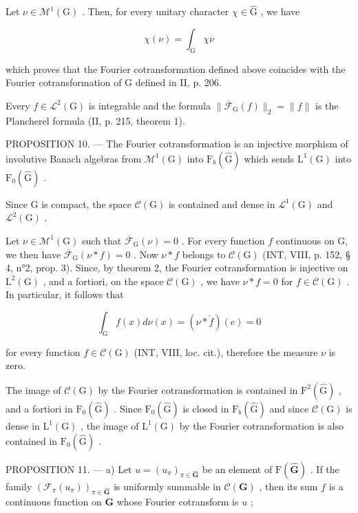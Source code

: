 Let \(\nu \in \mathcal{M}^1 (\mathrm{G})\) . Then, for every unitary character \(\chi \in \widehat{\mathrm{G}}\) , we have

\[
\chi (\nu) = \int_ {\mathrm{G}} \chi \nu
\]

which proves that the Fourier cotransformation defined above coincides with the Fourier cotransformation of G defined in II, p. 206.

Every \(f \in \mathcal{L}^2(\mathrm{G})\) is integrable and the formula \(\| \overline{\mathcal{F}}_{\mathrm{G}}(f)\| _2 = \| f\|\) is the Plancherel formula (II, p. 215, theorem 1).

PROPOSITION 10. --- The Fourier cotransformation is an injective morphism of involutive Banach algebras from \(\mathcal{M}^{1}(\mathrm{G})\) into \(\mathrm{F}_{b}(\widehat{\mathrm{G}})\) which sends \(\mathrm{L}^{1}(\mathrm{G})\) into \(\mathrm{F}_{0}(\widehat{\mathrm{G}})\) .

Since G is compact, the space \(\mathcal{C}(\mathrm{G})\) is contained and dense in \(\mathcal{L}^{1}(\mathrm{G})\) and \(\mathcal{L}^{2}(\mathrm{G})\) .

Let \(\nu \in \mathcal{M}^1 (\mathrm{G})\) such that \(\overline{\mathcal{F}}_{\mathrm{G}}(\nu) = 0\) . For every function \(f\) continuous on G, we then have \(\overline{\mathcal{F}}_{\mathrm{G}}(\nu *f) = 0\) . Now \(\nu *f\) belongs to \(\mathcal{C}(\mathrm{G})\) (INT, VIII, p. 152, § 4, n°2, prop. 3). Since, by theorem 2, the Fourier cotransformation is injective on \(\mathrm{L}^2 (\mathrm{G})\) , and a fortiori, on the space \(\mathcal{C}(\mathrm{G})\) , we have \(\nu *f = 0\) for \(f\in \mathcal{C}(\mathrm{G})\) . In particular, it follows that

\[
\int_ {\mathrm{G}} f (x) d \nu (x) = (\nu * \check {f}) (e) = 0
\]

for every function \(f \in \mathcal{C}(\mathrm{G})\) (INT, VIII, loc. cit.), therefore the measure \(\nu\) is zero.

The image of \(\mathcal{C}(\mathrm{G})\) by the Fourier cotransformation is contained in \(\mathrm{F}^2 (\widehat{\mathrm{G}})\) , and a fortiori in \(\mathrm{F}_0(\widehat{\mathrm{G}})\) . Since \(\mathrm{F}_0(\widehat{\mathrm{G}})\) is closed in \(\mathrm{F}_b(\widehat{\mathrm{G}})\) and since \(\mathcal{C}(\mathrm{G})\) is dense in \(\mathrm{L}^1 (\mathrm{G})\) , the image of \(\mathrm{L}^1 (\mathrm{G})\) by the Fourier cotransformation is also contained in \(\mathrm{F}_0(\widehat{\mathrm{G}})\) .

PROPOSITION 11. --- a) Let \(u = (u_{\pi})_{\pi \in \widehat{\mathbf{G}}}\) be an element of \(\mathrm{F}(\widehat{\mathbf{G}})\) . If the family \((\mathcal{F}_{\pi}(u_{\pi}))_{\pi \in \widehat{\mathbf{G}}}\) is uniformly summable in \(\mathcal{C}(\mathbf{G})\) , then its sum \(f\) is a continuous function on \(\mathbf{G}\) whose Fourier cotransform is \(u\) ;

